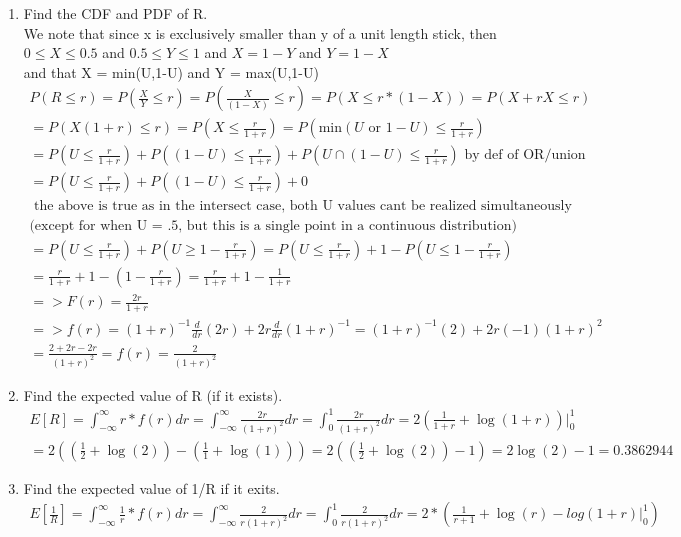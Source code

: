 \documentclass[11pt]{article}
\begin{document}
\begin{enumerate}
\begin{enumerate}
\begin{verbatim}
	\end{verbatim}
	\item Find the CDF and PDF of R.\\
	We note that since x is exclusively smaller than y of a unit length stick, then \\
	$0\le X \le 0.5$ and $0.5 \le Y \le 1$ and $X = 1-Y $ and $Y= 1-X$\\
	and that X = min(U,1-U) and Y = max(U,1-U)
	\begin{gather}
	P(R \le r) = P(\frac{X}{Y} \le r) =  P(\frac{X}{(1-X)} \le r) = P(X \le r*(1-X)) = P(X + rX \le r) \\
	= P(X(1+r) \le r) = P(X \le \frac{r}{1+r}) = P(\text{min}(U \text{ or }1-U) \le \frac{r}{1+r}) \\
	= P(U\le \frac{r}{1+r}) + P((1-U) \le \frac{r}{1+r}) + P(U\cap(1-U)\le \frac{r}{1+r}) \text{ by def of OR/union} \\
	= P(U\le \frac{r}{1+r}) + P((1-U) \le \frac{r}{1+r}) + 0 \\
	\text{ the above is true as in the intersect case, both U values cant be realized simultaneously}\\
	\text{(except for when U = .5, but this is a single point in a continuous distribution)}\\
	= P(U\le \frac{r}{1+r}) + P(U \ge 1 - \frac{r}{1+r} ) =  P(U\le \frac{r}{1+r}) + 1 - P(U \le 1 - \frac{r}{1+r} ) \\
	= \frac{r}{1+r} + 1 - (1-\frac{r}{1+r}) = \frac{r}{1+r} + 1 - \frac{1}{1+r} \\
	=> F(r) = \frac{2r}{1+r} \\
	=> f(r) = (1+r)^{-1} \frac{d}{dr}(2r)+ 2r\frac{d}{dr}(1+r)^{-1}=(1+r)^{-1}(2)+ 2r(-1)(1+r)^{2} \\
	= \frac{2+2r - 2r}{(1+r)^{2}} = f(r) = \frac{2}{(1+r)^{2}}
	\end{gather}
	\item Find the expected value of R (if it exists).
	\begin{gather}
	E[R] = \int_{-\infty}^{\infty}r*f(r)dr = \int_{-\infty}^{\infty}\frac{2r}{(1+r)^{2}}dr = \int_{0}^{1}\frac{2r}{(1+r)^{2}}dr = 2(\frac{1}{1+r} + \log(1+r))\Big|_0^1\\ 
	= 2((\frac{1}{2} + \log(2)) - (\frac{1}{1} + \log(1))) = 2((\frac{1}{2} + \log(2)) - 1) = 2\log(2) - 1 = 0.3862944
	\end{gather}
	\item Find the expected value of 1/R if it exits.
	\begin{gather}
	E[\frac{1}{R}] = \int_{-\infty}^{\infty}\frac{1}{r}*f(r)dr = \int_{-\infty}^{\infty}\frac{2}{r(1+r)^{2}}dr = \int_{0}^{1}\frac{2}{r(1+r)^{2}}dr = 2*(\frac{1}{r+1} + \log(r) - log(1+r)\Big|_0^1)\\ 

\end{gather}
\end{enumerate}
\end{enumerate}
\end{document}
